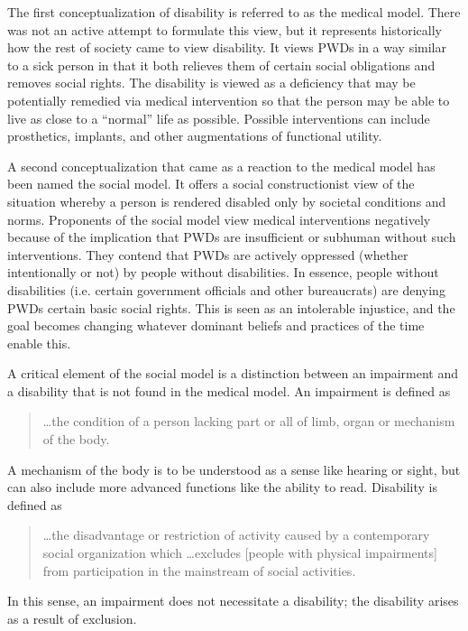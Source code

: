 \documentclass[a4paper]{article}
\begin{document}
The first conceptualization of disability is referred to as the medical model.
There was not an active attempt to formulate this view, but it represents
historically how the rest of society came to view disability. It views PWDs in
a way similar to a sick person in that it both relieves them of certain social
obligations and removes social rights. The disability is viewed as a
deficiency that may be potentially remedied via medical intervention so that
the person may be able to live as close to a ``normal'' life as possible.
Possible interventions can include prosthetics, implants, and other
augmentations of functional utility.

A second conceptualization that came as a reaction to the medical model has
been named the social model. It offers a social constructionist view of the
situation whereby a person is rendered disabled only by societal conditions
and norms. Proponents of the social model view medical interventions
negatively because of the implication that PWDs are insufficient or subhuman
without such interventions. They contend that PWDs are actively oppressed
(whether intentionally or not) by people without disabilities. In essence,
people without disabilities (i.e. certain government officials and other
bureaucrats) are denying PWDs certain basic social rights. This is seen as an
intolerable injustice, and the goal becomes changing whatever dominant beliefs
and practices of the time enable this. 

A critical element of the social model is a distinction between an impairment
and a disability that is not found in the medical model. An impairment is
defined as 
%
\begin{quote}
    \ldots the condition of a person lacking part or all of limb, organ or mechanism
    of the body.
\end{quote}
%
A mechanism of the body is to be understood as a sense like hearing or sight,
but can also include more advanced functions like the ability to read.
Disability is defined as 
%
\begin{quote}
    \ldots the disadvantage or restriction of activity caused by a contemporary
    social organization which \ldots excludes [people with physical
    impairments] from participation in the mainstream of social activities.
\end{quote}
%
In this sense, an impairment does not necessitate a disability; the disability
arises as a result of exclusion. 
\end{document}
